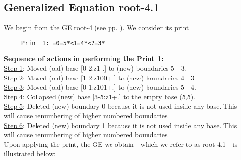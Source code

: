 \documentclass[final]{article}
\begin{document}
\subsection*{Generalized Equation root-4.1}
\label{root-4.1}We begin from the GE root-4 (see pp. \pageref{root-4}).  {We consider its print}
\begin{verbatim}
     Print 1: =0=5*<1=4*<2=3*
\end{verbatim}
{\bf Sequence of actions in performing the Print 1:}\\
{\underline{Step 1}:} Moved (old) base [0-2:z1-.]  to (new) boundaries 5 - 3.\\
{\underline{Step 2}:} Moved (old) base [1-2:z100+.]  to (new) boundaries 4 - 3.\\
{\underline{Step 3}:} Moved (old) base [0-1:z101+.]  to (new) boundaries 5 - 4.\\
{\underline{Step 4}:} Collapsed (new) base [3-5:z1+.]  to the empty base (5,5).
\\
{\underline{Step 5}:} Deleted (new) boundary 0 because it is not used inside any base.  This will cause renumbering of higher numbered boundaries.
\\
{\underline{Step 6}:} Deleted (new) boundary 1 because it is not used inside any base.  This will cause renumbering of higher numbered boundaries.
\\[0.1in]
{Upon applying the print, the GE we obtain---which we refer to as root-4.1---is illustrated below:}
\end{document}

